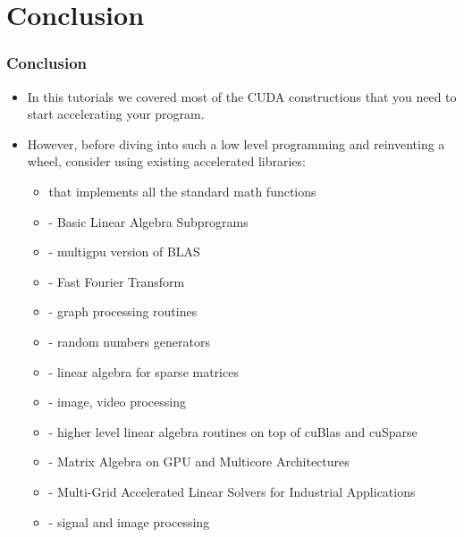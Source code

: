 \section{Conclusion}
\begin{frame}[fragile]
  \frametitle{Conclusion}
\begin{itemize}
  \item In this tutorials we covered most of the CUDA constructions that you need
    to start accelerating your program.
  \item However, before diving into such a low level programming and reinventing a wheel, 
    consider using existing accelerated libraries:
    \begin{itemize}
    \item {} that implements all the standard math functions
    \item {} - Basic Linear Algebra Subprograms
    \item {} - multigpu version of BLAS
    \item {} - Fast Fourier Transform
    \item {} - graph processing routines
    \item {} - random numbers generators
    \item {} - linear algebra for sparse matrices
    \item {} - image, video processing
    \item {} - higher level linear algebra routines on top of cuBlas and cuSparse
    \item {} - Matrix Algebra on GPU and Multicore Architectures
    \item {} - Multi-Grid Accelerated Linear Solvers for Industrial Applications
    \item {} - signal and image processing
    \end{itemize}
\end{itemize}
\end{frame}

